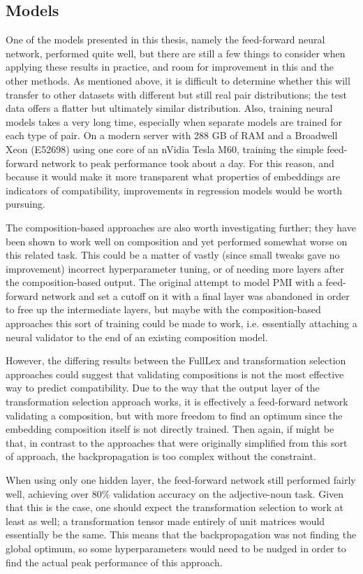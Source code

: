 \documentclass[a4paper, 12pt]{article}
\begin{document}
\subsection{Models}
One of the models presented in this thesis, namely the feed-forward neural network, performed quite well, but there are still a few things to consider when applying these results in practice, and room for improvement in this and the other methods. As mentioned above, it is difficult to determine whether this will transfer to other datasets with different but still real pair distributions; the test data offers a flatter but ultimately similar distribution. Also, training neural models takes a very long time, especially when separate models are trained for each type of pair. On a modern server with 288 GB of RAM and a Broadwell Xeon (E52698) using one core of an nVidia Tesla M60, training the simple feed-forward network to peak performance took about a day. For this reason, and because it would make it more transparent what properties of embeddings are indicators of compatibility, improvements in regression models would be worth pursuing.

The composition-based approaches are also worth investigating further; they have been shown to work well on composition and yet performed somewhat worse on this related task. This could be a matter of vastly (since small tweaks gave no improvement) incorrect hyperparameter tuning, or of needing more layers after the composition-based output. The original attempt to model PMI with a feed-forward network and set a cutoff on it with a final layer was abandoned in order to free up the intermediate layers, but maybe with the composition-based approaches this sort of training could be made to work, i.e. essentially attaching a neural validator to the end of an existing composition model.

However, the differing results between the FullLex and transformation selection approaches could suggest that validating compositions is not the most effective way to predict compatibility. Due to the way that the output layer of the transformation selection approach works, it is effectively a feed-forward network validating a composition, but with more freedom to find an optimum since the embedding composition itself is not directly trained. Then again, if might be that, in contrast to the approaches that were originally simplified from this sort of approach, the backpropagation is too complex without the constraint.

When using only one hidden layer, the feed-forward network still performed fairly well, achieving over 80\% validation accuracy on the adjective-noun task. Given that this is the case, one should expect the transformation selection to work at least as well; a transformation tensor made entirely of unit matrices would essentially be the same. This means that the backpropagation was not finding the global optimum, so some hyperparameters would need to be nudged in order to find the actual peak performance of this approach.
\end{document}
